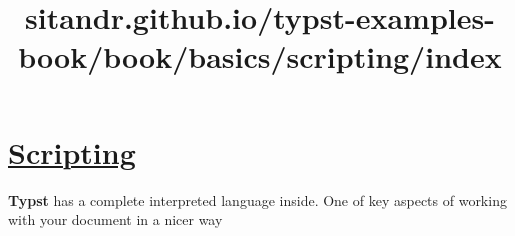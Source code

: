 \title{sitandr.github.io/typst-examples-book/book/basics/scripting/index}

\section{\texorpdfstring{\hyperref[scripting]{Scripting}}{Scripting}}\label{scripting}

\textbf{Typst} has a complete interpreted language inside. One of key
aspects of working with your document in a nicer way
